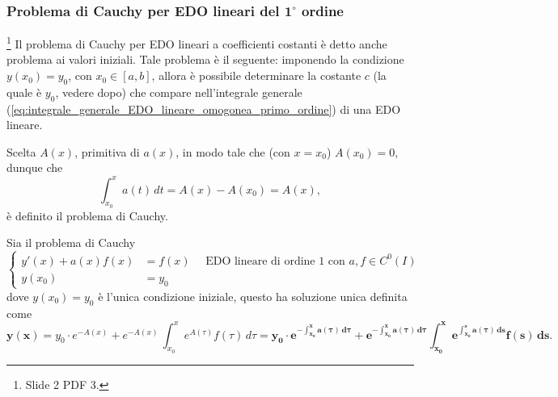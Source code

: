 \subsubsection{Problema di Cauchy per EDO lineari del \texorpdfstring{$\boldsymbol{1^{\circ}}$}{1°} ordine}\label{ssec:problema_cauchy}

\footnote{Slide 2 PDF 3.} Il problema di Cauchy per EDO lineari a coefficienti costanti è detto anche problema ai valori iniziali. Tale problema è il seguente: imponendo la condizione $y(x_0)=y_0$, con $x_0\in[a,b]$, allora è possibile determinare la costante $c$ (la quale è $y_0$, vedere dopo) che compare nell'integrale generale (\ref{eq:integrale_generale_EDO_lineare_omogonea_primo_ordine}) di una EDO lineare.

Scelta $A(x)$, primitiva di $a(x)$, in modo tale che (con $x=x_0$) $A(x_0)=0$, dunque che
\begin{equation}\label{eq:primitiva_problema_cauchy}
    \int_{x_0}^{x} a(t)\, dt = A(x) - A(x_0) = A(x),
\end{equation}
è definito il problema di Cauchy.
\begin{definition}
    Sia il problema di Cauchy 
    \begin{equation}\label{eq:problema_cauchy_edo_primo_ordine_coeff_costanti}
        \begin{cases}
            y'(x) + a(x)f(x)&=f(x)\quad\text{ EDO lineare di ordine 1 con $a,f\in C^0(I)$}\\
            y(x_0)&=y_0
        \end{cases}
    \end{equation}
    dove $y(x_0)=y_0$ è l'unica condizione iniziale, questo ha soluzione unica definita come
    \begin{equation}\label{eq:soluzione_problema_cauchy_primo_ordine_coeff_costanti}
        \boldsymbol{y(x)} = y_0 \cdot e^{-A(x)} + e^{-A(x)} \, \int_{x_0}^x e^{A(\tau)}f(\tau) \, d\tau = \boldsymbol{y_0 \cdot e^{-\int_{x_0}^x a(\tau)\, d\tau} + e^{-\int_{x_0}^x a(\tau)\, d\tau} \int_{x_0}^x e^{\int_{x_0}^s a(\tau)\, ds} f(s)\, ds}.
    \end{equation}
\end{definition}

